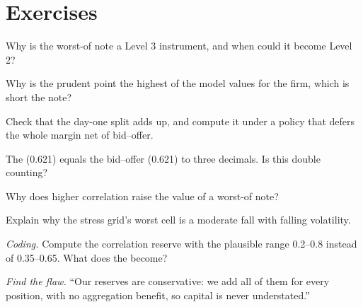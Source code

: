 \section{Exercises}

\begin{exercise}[$\star$]\label{exo:dv:managing-an-exotic-book:1}
Why is the worst-of note a Level 3 instrument, and when could it become Level 2?
\end{exercise}

\begin{exercise}[$\star$]\label{exo:dv:managing-an-exotic-book:2}
Why is the prudent point the highest of the model values for the firm, which is short the note?
\end{exercise}

\begin{exercise}[$\star$]\label{exo:dv:managing-an-exotic-book:3}
Check that the day-one split adds up, and compute it under a policy that defers the whole margin net of bid--offer.
\end{exercise}

\begin{exercise}[$\star\star$]\label{exo:dv:managing-an-exotic-book:4}
The  (0.621) equals the  bid--offer (0.621) to three decimals. Is this double counting?
\end{exercise}

\begin{exercise}[$\star\star$]\label{exo:dv:managing-an-exotic-book:5}
Why does higher correlation raise the value of a worst-of note?
\end{exercise}

\begin{exercise}[$\star\star$]\label{exo:dv:managing-an-exotic-book:6}
Explain why the stress grid's worst cell is a moderate fall with falling volatility.
\end{exercise}

\begin{exercise}[$\star\star\star$]\label{exo:dv:managing-an-exotic-book:7}
\emph{Coding.} Compute the correlation reserve with the plausible range 0.2--0.8 instead of 0.35--0.65. What does the  become?
\end{exercise}

\begin{exercise}[$\star\star\star$]\label{exo:dv:managing-an-exotic-book:8}
\emph{Find the flaw.} ``Our reserves are conservative: we add all of them for every position, with no aggregation benefit, so capital is never understated.''
\end{exercise}

